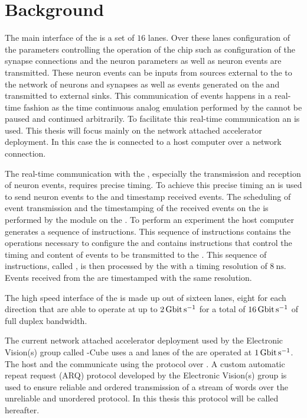 \section{Background}
The main interface of the \HICANNX{} \ASIC{} is a set of $\num{16}$ \LVDS{} lanes. Over these \LVDS{} lanes configuration of the parameters controlling the operation of the chip such as configuration of the synapse connections and the neuron parameters as well as neuron events are transmitted. These neuron events can be inputs from sources external to the \ASIC{} to the network of neurons and synapses as well as events generated on the \ASIC{} and transmitted to external sinks.
This communication of events happens in a real-time fashion as the time continuous analog emulation performed by the \ASIC{} cannot be paused and continued arbitrarily. To facilitate this real-time communication  an \FPGA{} is used. This thesis will focus mainly on the network attached accelerator deployment. In this case the \FPGA{} is connected to a host computer over a network connection.

The real-time communication with the \ASIC{}, especially the transmission and reception of neuron events, requires precise timing\autocite{ref:precise_timing}.
To achieve this precise timing an \FPGA{} is used to send neuron events to the \ASIC{} and timestamp received events. The scheduling of event transmission and the timestamping of the received events on the \FPGA{} is performed by the \pbexec{} module on the \FPGA{}.
To perform an experiment the host computer generates a sequence of instructions. This sequence of instructions contains the operations necessary to configure the \ASIC{} and contains instructions that control the timing and content of events to be transmitted to the \ASIC{}.
This sequence of instructions, called \PlaybackProgram{}, is then processed by the \pbexec{} with a timing resolution of $\SI{8}{\nano\second}$.
Events received from the \ASIC{} are timestamped with the same resolution.

The high speed interface of the \ASIC{} is made up out of sixteen \LVDS{} lanes, eight for each direction that are able to operate at up to $\SI{2}{\giga\bit\per\second}$ for a total of $\SI{16}{\giga\bit\per\second}$ of full duplex bandwidth.

The current network attached accelerator deployment used by the Electronic Vision(s) group called \BSSTwo{}-Cube\autocite{ref:bss_cube} uses a \Xilinx{}  \FPGA{} and \LVDS{} lanes of the \ASIC{} are operated at $\SI{1}{\giga\bit\per\second}$. The host and the \FPGA{} communicate using the \UDP{} protocol over \Gigabitethernet{}. A custom automatic repeat request (ARQ) protocol\autocite{ref:hostarq} developed by the Electronic Vision(s) group is used to ensure reliable and ordered transmission of a stream of \PhyWordSize{} words over the unreliable and unordered \UDP{} protocol. In this thesis this protocol will be called \HostARQ{} hereafter.

